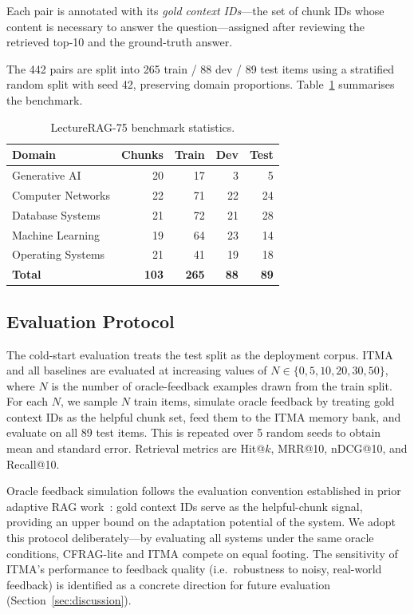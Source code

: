 \documentclass[preprint,12pt]{elsarticle}
\begin{document}
Each pair is annotated with its \emph{gold context IDs}---the set of chunk IDs
whose content is necessary to answer the question---assigned after reviewing
the retrieved top-10 and the ground-truth answer.

The 442 pairs are split into 265 train / 88 dev / 89 test items using a
stratified random split with seed 42, preserving domain proportions.
Table~\ref{tab:benchmark} summarises the benchmark.

\begin{table}[htbp]
\centering
\small
\caption{LectureRAG-75 benchmark statistics.}
\label{tab:benchmark}
\begin{tabular}{lrrrr}
\toprule
Domain & Chunks & Train & Dev & Test \\
\midrule
Generative AI        & 20 &  17 &  3 &  5 \\
Computer Networks    & 22 &  71 & 22 & 24 \\
Database Systems     & 21 &  72 & 21 & 28 \\
Machine Learning     & 19 &  64 & 23 & 14 \\
Operating Systems    & 21 &  41 & 19 & 18 \\
\midrule
\textbf{Total}       & \textbf{103} & \textbf{265} & \textbf{88} & \textbf{89} \\
\bottomrule
\end{tabular}
\end{table}

\subsection{Evaluation Protocol}
The cold-start evaluation treats the test split as the deployment corpus.
ITMA and all baselines are evaluated at increasing values of
$N\in\{0,5,10,20,30,50\}$, where $N$ is the number of oracle-feedback examples
drawn from the train split.  For each $N$, we sample $N$ train items,
simulate oracle feedback by treating gold context IDs as the helpful chunk
set, feed them to the ITMA memory bank, and evaluate on all 89 test items.
This is repeated over 5 random seeds to obtain mean and standard error.
Retrieval metrics are Hit@$k$, MRR@10, nDCG@10, and Recall@10.

Oracle feedback simulation follows the evaluation convention established in
prior adaptive RAG work~\citep{cfrag2025}: gold context IDs serve as the
helpful-chunk signal, providing an upper bound on the adaptation potential of
the system.  We adopt this protocol deliberately---by evaluating all systems
under the same oracle conditions, CFRAG-lite and ITMA compete on equal
footing.  The sensitivity of ITMA's performance to feedback quality (i.e.\
robustness to noisy, real-world feedback) is identified as a concrete direction
for future evaluation (Section~\ref{sec:discussion}).
\end{document}
